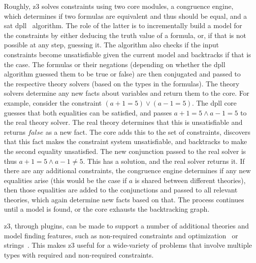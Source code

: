 Roughly, \gls{z3} solves constraints using two core modules, a
congruence engine, which determines if two formulas are equivalent and
thus should be equal, and a \gls{sat} \gls{dpll}~\cite{Davis:1962:MPT:368273.368557} algorithm. The role of the latter
is to incrementally build a model for the constraints by either
deducing the truth value of a formula, or, if that is not possible at
any step, guessing it. The algorithm also checks if the input
constraints become unsatisfiable given the current model and
backtracks if that is the case. The formulas or their negations
(depending on whether the \gls{dpll} algorithm guessed them to be true
or false) are then conjugated and passed to the respective theory
solvers (based on the types in the formulas). The theory solvers
determine any new facts about variables and return them to the
core. For example, consider the constraint
$(a + 1 = 5) \vee (a - 1 = 5)$. The \gls{dpll} core guesses that both
equalities can be satisfied, and passes $a + 1 = 5 \wedge a - 1 = 5$
to the real theory solver. The real theory determines that this is
unsatisfiable and returns $false$ as a new fact. The core adds this to
the set of constraints, discovers that this fact makes the constraint
system unsatisfiable, and backtracks to make the second equality
unsatisfied. The new conjunction passed to the real solver is thus
$a + 1 = 5 \wedge a - 1 \neq 5$. This has a solution, and the real
solver returns it. If there are any additional constraints, the
congruence engine determines if any new equalities arise (this would
be the case if $a$ is shared between different theories), then those
equalities are added to the conjunctions and passed to all relevant
theories, which again determine new facts based on that. The process
continues until a model is found, or the core exhausts the
backtracking graph.

\gls{z3}, through plugins, can be made to support a number of
additional theories and model finding features, such as non-required
constraints and optimization~\cite{bjornernuz} or strings~\cite{zheng2013z3}. This makes \gls{z3} useful for a wide-variety of
problems that involve multiple types with required and non-required
constraints.
\ParSep

